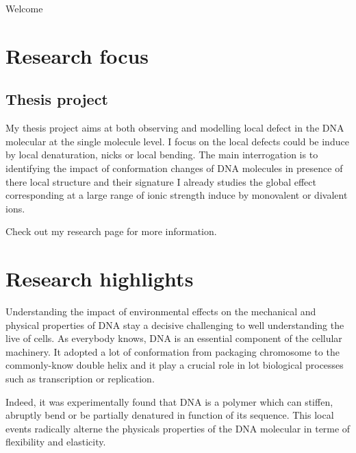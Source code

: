 Welcome 
\section{Research focus}
\subsection{Thesis project}
My thesis project aims at both observing and modelling local defect in the DNA molecular at the single molecule level. I focus on the local defects could be induce by local denaturation, nicks or local bending. The main interrogation is to identifying the impact of conformation changes of DNA molecules in presence of there local structure and their signature
I already studies the global effect corresponding at a large range of ionic strength induce by monovalent or divalent ions.


Check out my research page for more information.



\section{Research highlights}


Understanding the impact of environmental effects on the mechanical and physical properties of DNA stay a decisive challenging to well understanding the live of cells. As everybody knows, DNA is an essential component of the cellular machinery. It adopted a lot of conformation from packaging chromosome to the commonly-know double helix and it play a crucial role in lot biological processes such as transcription or replication.

Indeed, it was experimentally found that DNA is a polymer which can stiffen, abruptly bend or be partially denatured in function of its sequence. This local events radically alterne the physicals properties of the DNA molecular in terme of flexibility and elasticity.

